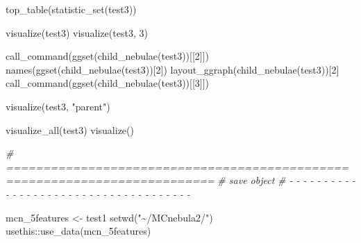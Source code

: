 \documentclass[
]{article}
\newenvironment{Shaded}{\begin{snugshade}}{\end{snugshade}}
\newcommand{\CommentTok}[1]{\textcolor[rgb]{0.56,0.35,0.01}{\textit{#1}}}
\newcommand{\DecValTok}[1]{\textcolor[rgb]{0.00,0.00,0.81}{#1}}
\newcommand{\FunctionTok}[1]{\textcolor[rgb]{0.00,0.00,0.00}{#1}}
\newcommand{\NormalTok}[1]{#1}
\newcommand{\OtherTok}[1]{\textcolor[rgb]{0.56,0.35,0.01}{#1}}
\newcommand{\SpecialCharTok}[1]{\textcolor[rgb]{0.00,0.00,0.00}{#1}}
\newcommand{\StringTok}[1]{\textcolor[rgb]{0.31,0.60,0.02}{#1}}
\begin{document}
\begin{Shaded}
\begin{Highlighting}[]
\FunctionTok{top\_table}\NormalTok{(}\FunctionTok{statistic\_set}\NormalTok{(test3))}

\FunctionTok{visualize}\NormalTok{(test3)}
\FunctionTok{visualize}\NormalTok{(test3, }\DecValTok{3}\NormalTok{)}

\FunctionTok{call\_command}\NormalTok{(}\FunctionTok{ggset}\NormalTok{(}\FunctionTok{child\_nebulae}\NormalTok{(test3))[[}\DecValTok{2}\NormalTok{]])}
\FunctionTok{names}\NormalTok{(}\FunctionTok{ggset}\NormalTok{(}\FunctionTok{child\_nebulae}\NormalTok{(test3))[}\DecValTok{2}\NormalTok{])}
\FunctionTok{layout\_ggraph}\NormalTok{(}\FunctionTok{child\_nebulae}\NormalTok{(test3))[}\DecValTok{2}\NormalTok{]}
\FunctionTok{call\_command}\NormalTok{(}\FunctionTok{ggset}\NormalTok{(}\FunctionTok{child\_nebulae}\NormalTok{(test3))[[}\DecValTok{3}\NormalTok{]])}

\FunctionTok{visualize}\NormalTok{(test3, }\StringTok{"parent"}\NormalTok{)}

\FunctionTok{visualize\_all}\NormalTok{(test3)}
\FunctionTok{visualize}\NormalTok{()}
\end{Highlighting}
\end{Shaded}

\begin{Shaded}
\begin{Highlighting}[]
\CommentTok{\# ==========================================================================}
\CommentTok{\# save object}
\CommentTok{\# {-} {-} {-} {-} {-} {-} {-} {-} {-} {-} {-} {-} {-} {-} {-} {-} {-} {-} {-} {-} {-} {-} {-} {-} {-} {-} {-} {-} {-} {-} {-} {-} {-} {-} {-} {-} {-}}

\NormalTok{mcn\_5features }\OtherTok{\textless{}{-}}\NormalTok{ test1}
\FunctionTok{setwd}\NormalTok{(}\StringTok{"\textasciitilde{}/MCnebula2/"}\NormalTok{)}
\NormalTok{usethis}\SpecialCharTok{::}\FunctionTok{use\_data}\NormalTok{(mcn\_5features)}
\end{Highlighting}
\end{Shaded}
\end{document}
